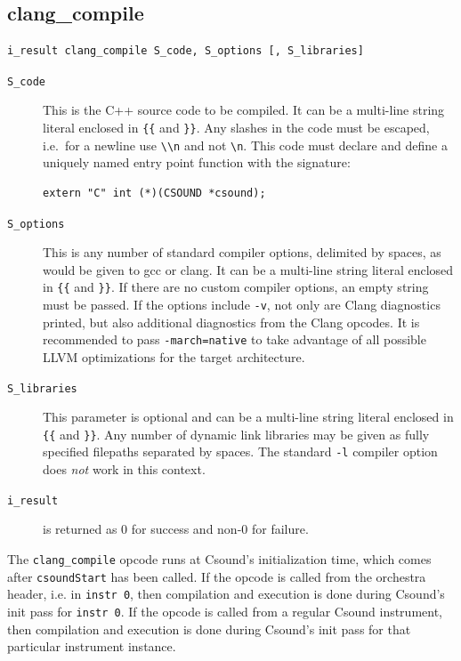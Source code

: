 \documentclass[letterpaper, 12pt]{article}
\begin{document}
\subsection{clang\_compile}

\begin{Verbatim}[fontfamily=courier, xleftmargin=\parindent]
i_result clang_compile S_code, S_options [, S_libraries]
\end{Verbatim}

\begin{description}
\item[\texttt{S\_code}] This is the C++ source code to be compiled. It can be a multi-line string literal enclosed in \verb|{{| and \verb|}}|. Any slashes in the code must be escaped, i.e.\ for a newline use \verb|\\n| and not \verb|\n|. This code must declare and define a 
uniquely named entry point function with the signature:

\begin{Verbatim}[fontfamily=courier, xleftmargin=\parindent]
extern "C" int (*)(CSOUND *csound);
\end{Verbatim}

\item[\texttt{S\_options}] This is any number of standard compiler options, delimited by spaces, as would be given to gcc or clang. It can be a multi-line string literal enclosed in \verb|{{| and \verb|}}|. If there are no custom compiler options, an empty string must be passed. If the options include \verb|-v|, not only are Clang diagnostics printed, but also additional diagnostics from the Clang opcodes. It is recommended to pass \verb|-march=native| to take advantage of all possible LLVM optimizations for the target architecture.
\item[\texttt{S\_libraries}] This parameter is optional and can be a multi-line string literal enclosed in \verb|{{| and \verb|}}|. Any number of dynamic link libraries may be given as fully specified filepaths separated by spaces. The standard \texttt{-l} compiler option does \textit{not} work in this context.
\item[\texttt{i\_result}] is returned as 0 for success and non-0 for failure. 
\end{description}

The \verb|clang_compile| opcode runs at Csound's initialization time, which 
comes after \verb|csoundStart| has been called. If the opcode is called from the 
orchestra header, i.e. in \verb|instr 0|, then compilation and execution is done during Csound's init pass for \verb|instr 0|. If the opcode is called from a regular Csound 
instrument, then compilation and execution is done during Csound's init pass for that particular instrument instance.
\end{document}
